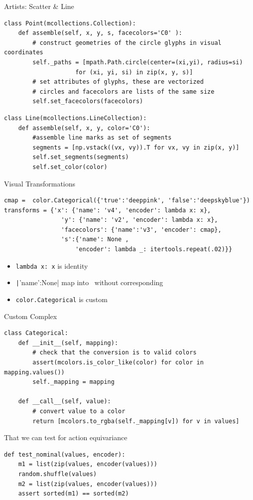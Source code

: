 \documentclass[xcolor={dvipsnames}, handout]{beamer}
\begin{document}
\begin{frame}[fragile]{Artists: Scatter \& Line}
\begin{verbatim}
class Point(mcollections.Collection):
    def assemble(self, x, y, s, facecolors='C0' ):
        # construct geometries of the circle glyphs in visual coordinates
        self._paths = [mpath.Path.circle(center=(xi,yi), radius=si) 
                    for (xi, yi, si) in zip(x, y, s)] 
        # set attributes of glyphs, these are vectorized 
        # circles and facecolors are lists of the same size
        self.set_facecolors(facecolors)
\end{verbatim} 
    \pause
\begin{verbatim}
class Line(mcollections.LineCollection):
    def assemble(self, x, y, color='C0'):
        #assemble line marks as set of segments 
        segments = [np.vstack((vx, vy)).T for vx, vy in zip(x, y)]
        self.set_segments(segments)
        self.set_color(color)
\end{verbatim}
\end{frame}

\begin{frame}[fragile]{Visual Transformations}
\begin{verbatim}
cmap =  color.Categorical({'true':'deeppink', 'false':'deepskyblue'})
transforms = {'x': {'name': 'v4', 'encoder': lambda x: x},
                'y': {'name': 'v2', 'encoder': lambda x: x},
                'facecolors': {'name':'v3', 'encoder': cmap}, 
                's':{'name': None , 
                    'encoder': lambda _: itertools.repeat(.02)}}
\end{verbatim}
    \begin{itemize}
        \item \texttt{lambda x: x} is identity \vchannel\
        \item \texttt|{'name':None}| map into \vfiber\ without corresponding \dsection\
        \item \texttt{color.Categorical} is custom \vchannel
    \end{itemize}
\end{frame}

\begin{frame}[fragile]{Custom Complex \vchannel}
\begin{verbatim}
class Categorical:
    def __init__(self, mapping):
        # check that the conversion is to valid colors
        assert(mcolors.is_color_like(color) for color in mapping.values())
        self._mapping = mapping

    def __call__(self, value):
        # convert value to a color
        return [mcolors.to_rgba(self._mapping[v]) for v in values]
\end{verbatim}
\pause
That we can test for action equivariance
\begin{verbatim}
def test_nominal(values, encoder):
    m1 = list(zip(values, encoder(values)))
    random.shuffle(values)
    m2 = list(zip(values, encoder(values)))
    assert sorted(m1) == sorted(m2)
\end{verbatim}
\end{frame}
\end{document}
